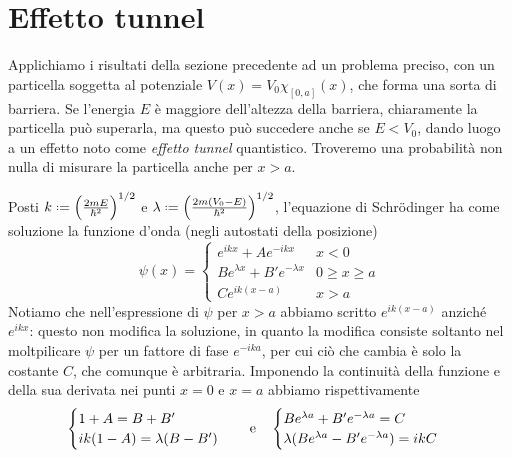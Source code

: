 \section{Effetto tunnel}
Applichiamo i risultati della sezione precedente ad un problema preciso, con un particella soggetta al potenziale $V(x)=V_0\chi_{[0,a]}(x)$, che forma una sorta di barriera.
Se l'energia $E$ è maggiore dell'altezza della barriera, chiaramente la particella può superarla, ma questo può succedere anche se $E<V_0$, dando luogo a un effetto noto come \emph{effetto tunnel} quantistico.
Troveremo una probabilità non nulla di misurare la particella anche per $x>a$.

Posti $k\defeq\Big(\frac{2mE}{\hbar^2}\Big)^{1/2}$ e $\lambda\defeq\Big(\frac{2m(V_0-E)}{\hbar^2}\Big)^{1/2}$, l'equazione di Schr\"odinger ha come soluzione la funzione d'onda (negli autostati della posizione)
\begin{equation}
	\psi(x)=
	\begin{cases}
		e^{ikx}+Ae^{-ikx}				&x<0\\
		Be^{\lambda x}+B'e^{-\lambda x}	&0\ge x\ge a\\
		Ce^{ik(x-a)}					&x>a
	\end{cases}
	\label{eq:tunnel-wf}
\end{equation}
Notiamo che nell'espressione di $\psi$ per $x>a$ abbiamo scritto $e^{ik(x-a)}$ anzich\'e $e^{ikx}$: questo non modifica la soluzione, in quanto la modifica consiste soltanto nel moltpilicare $\psi$ per un fattore di fase $e^{-ika}$, per cui ciò che cambia è solo la costante $C$, che comunque è arbitraria.
Imponendo la continuità della funzione e della sua derivata nei punti $x=0$ e $x=a$ abbiamo rispettivamente
\begin{equation}
	\begin{cases}
		1+A=B+B'\\
		ik(1-A)=\lambda(B-B')
	\end{cases}
	\quad\text{e}\quad
	\begin{cases}
		Be^{\lambda a}+B'e^{-\lambda a}=C\\
		\lambda(Be^{\lambda a}-B'e^{-\lambda a})=ikC
	\end{cases}
\end{equation}

